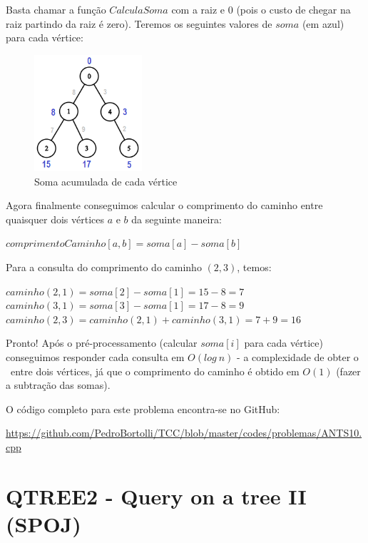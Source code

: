 Basta chamar a função $CalculaSoma$ com a raiz e $0$ (pois o custo de chegar na raiz partindo da raiz é zero). Teremos os seguintes valores de $soma$ (em azul) para cada vértice:

\begin{figure}[htb]
\begin{center}
\includegraphics[width=4cm]{images/ants10-graph2.png}
\end{center}
\caption{\label{fig:arvore-euler2}Soma acumulada de cada vértice}
\end{figure}

Agora finalmente conseguimos calcular o comprimento do caminho entre quaisquer dois vértices $a$ e $b$ da seguinte maneira:

\begin{center}
$comprimentoCaminho[a, b] = soma[a] - soma[b]$
\end{center}

Para a consulta do comprimento do caminho $(2, 3)$, temos:
\begin{center}
$caminho(2, 1) = soma[2] - soma[1] = 15 - 8 = 7$\\
$caminho(3, 1) = soma[3] - soma[1] = 17 - 8 = 9$\\
$caminho(2, 3) = caminho (2, 1) + caminho(3, 1) = 7 + 9 = 16$
\end{center}

Pronto! Após o pré-processamento (calcular $soma[i]$ para cada vértice) conseguimos responder cada consulta em $O(log\ n)$ - a complexidade de obter o \LCA\ entre dois vértices, já que o comprimento do caminho é obtido em $O(1)$ (fazer a subtração das somas).

\vspace{0.5cm}

O código completo para este problema encontra-se no GitHub:

\url{https://github.com/PedroBortolli/TCC/blob/master/codes/problemas/ANTS10.cpp}

\vspace{10cm}

\section{QTREE2 - Query on a tree II  (SPOJ)}

